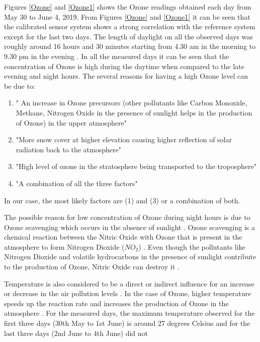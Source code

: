 Figures \ref{Ozone} and \ref{Ozone1} shows the Ozone readings obtained each day from May 30 to June 4, 2019. From Figures \ref{Ozone} and \ref{Ozone1} it can be seen that the calibrated sensor system shows a strong correlation with the reference system except for the last two days. The length of daylight on all the observed days was roughly around 16 hours and 30 minutes starting from 4.30 am in the morning to 9.30 pm in the evening \cite{daylight}. In all the measured days it can be seen that the concentration of Ozone is high during the daytime when compared to the late evening and night hours. The several reasons for having a high Ozone level can be due to:\cite{EnvironmentalQualitySectionMoE2012} 
\begin{enumerate}
  \item " An increase in Ozone precursors (other pollutants like Carbon Monoxide, Methane, Nitrogen Oxide in the presence of sunlight helps in the production of Ozone) in the upper atmosphere" 
  \item "More snow cover at higher elevation causing higher reflection of solar radiation back to the atmosphere" 
  \item "High level of ozone in the stratosphere being transported to the troposphere" 
  \item "A combination of all the three factors" 
\end{enumerate} 
 In our case,  the most likely factors are (1) and (3) or a combination of both. 

 The possible reason for low concentration of Ozone during night hours is due to Ozone scavenging which occurs in the absence of sunlight \cite{EnvironmentalQualitySectionMoE2012}. Ozone scavenging is a chemical reaction between the Nitric Oxide with Ozone that is present in the atmosphere to form Nitrogen Dioxide (${NO_2}$) \cite{airqualityontario}. Even though the pollutants like Nitrogen Dioxide and volatile hydrocarbons in the presence of sunlight contribute to the production of Ozone, Nitric Oxide can destroy it \cite{airqualityontario} \cite{EnvironmentalQualitySectionMoE2012}.

 
Temperature is also considered to be a direct or indirect influence for an increase or decrease in the air pollution levels \cite{EnvironmentalQualitySectionMoE2012}. In the case of Ozone, higher temperature speeds up the reaction rate and increases the production of Ozone in the atmosphere \cite{coates2016influence}. For the measured days, the maximum temperature observed for the first three days (30th May to 1st June) is around 27 degrees Celsius and for the last three days (2nd June to 4th June) did not 



